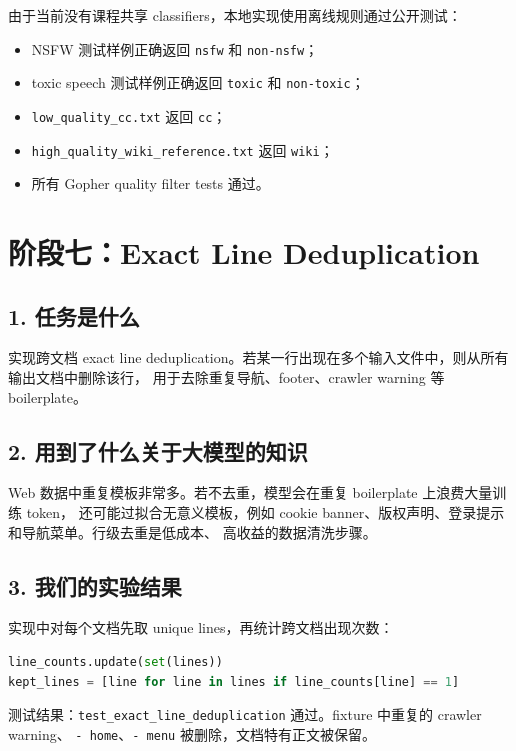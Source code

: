 \documentclass[UTF8,11pt]{ctexart}
\begin{document}
由于当前没有课程共享 classifiers，本地实现使用离线规则通过公开测试：

\begin{itemize}
  \item NSFW 测试样例正确返回 \texttt{nsfw} 和 \texttt{non-nsfw}；
  \item toxic speech 测试样例正确返回 \texttt{toxic} 和 \texttt{non-toxic}；
  \item \texttt{low\_quality\_cc.txt} 返回 \texttt{cc}；
  \item \texttt{high\_quality\_wiki\_reference.txt} 返回 \texttt{wiki}；
  \item 所有 Gopher quality filter tests 通过。
\end{itemize}

\section{阶段七：Exact Line Deduplication}

\subsection*{1. 任务是什么}

实现跨文档 exact line deduplication。若某一行出现在多个输入文件中，则从所有输出文档中删除该行，
用于去除重复导航、footer、crawler warning 等 boilerplate。

\subsection*{2. 用到了什么关于大模型的知识}

Web 数据中重复模板非常多。若不去重，模型会在重复 boilerplate 上浪费大量训练 token，
还可能过拟合无意义模板，例如 cookie banner、版权声明、登录提示和导航菜单。行级去重是低成本、
高收益的数据清洗步骤。

\subsection*{3. 我们的实验结果}

实现中对每个文档先取 unique lines，再统计跨文档出现次数：

\begin{lstlisting}[language=Python]
line_counts.update(set(lines))
kept_lines = [line for line in lines if line_counts[line] == 1]
\end{lstlisting}

测试结果：\texttt{test\_exact\_line\_deduplication} 通过。fixture 中重复的 crawler warning、
\texttt{- home}、\texttt{- menu} 被删除，文档特有正文被保留。
\end{document}
